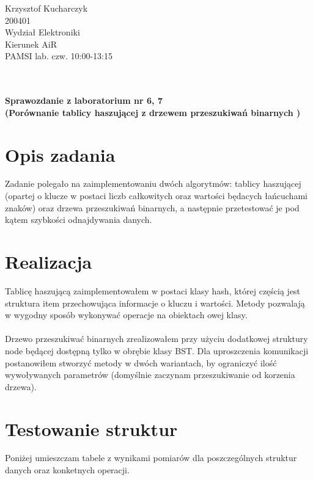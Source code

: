 \documentclass[a4paper,12pt]{article}
\begin{document}
{\raggedleft{}Krzysztof Kucharczyk}\\200401\\Wydział Elektroniki\\Kierunek AiR
\\PAMSI lab. czw. 10:00-13:15\\\\\\
\begin{center} 
	\textbf{Sprawozdanie z laboratorium nr 6, 7\\(Porównanie tablicy haszującej z drzewem przeszukiwań binarnych )}
\end{center}

\section{Opis zadania}

Zadanie polegało na zaimplementowaniu dwóch algorytmów: tablicy haszującej (opartej o klucze w postaci liczb całkowitych oraz wartości będacych łańcuchami znaków) oraz drzewa przeszukiwań binarnych, a następnie przetestować je pod kątem szybkości odnajdywania danych.
\section{Realizacja}

Tablicę haszującą zaimplementowałem w postaci klasy hash, której częścią jest struktura item przechowująca informacje o kluczu i wartości. Metody pozwalają w wygodny sposób wykonywać operacje na obiektach owej klasy.\\\\
Drzewo przeszukiwać binarnych zrealizowałem przy użyciu dodatkowej struktury node będącej dostępną tylko w obrębie klasy BST. Dla uproszczenia komunikacji postanowiłem stworzyć metody w dwóch wariantach, by ograniczyć ilość wywoływanych parametrów (domyślnie zaczynam przeszukiwanie od korzenia drzewa).

\newpage
\section{Testowanie struktur}

Poniżej umieszczam tabele z wynikami pomiarów dla poszczególnych struktur danych oraz konketnych operacji.
\end{document}
